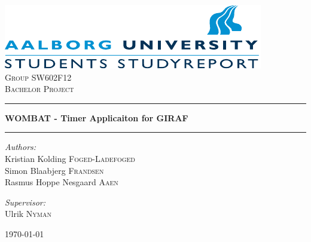 \begin{titlepage}

\begin{center}

\includegraphics[width=\textwidth]{Images/aau_logo_en.pdf}\\[1cm]    

\textsc{\LARGE Group SW602F12}\\[1.5cm]

\textsc{\Large Bachelor Project}\\[0.5cm]


\hrule
\vspace{0.4cm}

{ \huge \bfseries WOMBAT - Timer Applicaiton for GIRAF}\\[0.4cm]

\hrule
\vspace{1.5cm}

\begin{minipage}{0.4\textwidth}
\begin{flushleft} \large
\vspace{1.25cm}
\emph{Authors:}\\
Kristian Kolding \textsc{Foged-Ladefoged} \\

Simon Blaabjerg \textsc{Frandsen} \\

Rasmus Hoppe Nesgaard \textsc{Aaen}
\end{flushleft}
\end{minipage}
\begin{minipage}{0.4\textwidth}
\begin{flushright} \large
\emph{Supervisor:} \\
Ulrik \textsc{Nyman}
\end{flushright}
\end{minipage}

\vfill

{\large \today}

\end{center}

\end{titlepage}
